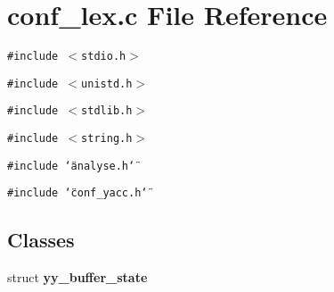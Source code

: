 \section{conf\_\-lex.c File Reference}
\label{conf__lex_8c}
{\tt \#include $<$stdio.h$>$}\par
{\tt \#include $<$unistd.h$>$}\par
{\tt \#include $<$stdlib.h$>$}\par
{\tt \#include $<$string.h$>$}\par
{\tt \#include \char`\"{}analyse.h\char`\"{}}\par
{\tt \#include \char`\"{}conf\_\-yacc.h\char`\"{}}\par
\subsection*{Classes}
\begin{CompactItemize}
\item 
struct {\bf yy\_\-buffer\_\-state}
\end{CompactItemize}
